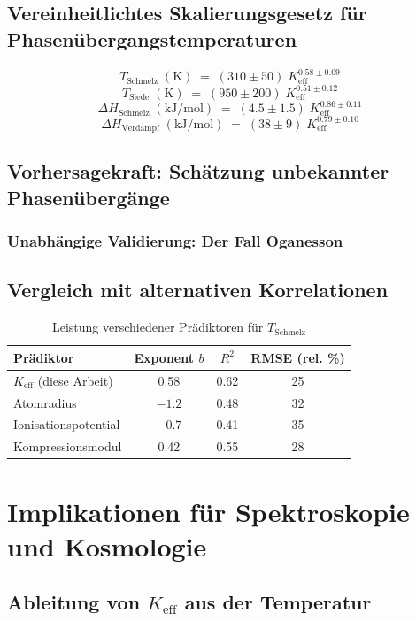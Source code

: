 \documentclass[12pt,a4paper]{article}
\theoremstyle{remark}
\newcommand{\Keff}{K_{\mathrm{eff}}}
\begin{document}
	\subsection{Vereinheitlichtes Skalierungsgesetz für Phasenübergangstemperaturen}
	\[
	\boxed{T_{\text{Schmelz}} \;(\mathrm{K}) \;=\; (310 \pm 50) \; \Keff^{0.58 \pm 0.09}}
	\]
	\[
	\boxed{T_{\text{Siede}} \;(\mathrm{K}) \;=\; (950 \pm 200) \; \Keff^{0.51 \pm 0.12}}
	\]
	\[
	\boxed{\Delta H_{\text{Schmelz}} \;(\mathrm{kJ/mol}) \;=\; (4.5 \pm 1.5) \; \Keff^{0.86 \pm 0.11}}
	\]
	\[
	\boxed{\Delta H_{\text{Verdampf}} \;(\mathrm{kJ/mol}) \;=\; (38 \pm 9) \; \Keff^{0.79 \pm 0.10}}
	\]
	
	\subsection{Vorhersagekraft: Schätzung unbekannter Phasenübergänge}
	\subsubsection{Unabhängige Validierung: Der Fall Oganesson}
	\subsection{Vergleich mit alternativen Korrelationen}
	
	\begin{table}[htbp]
		\centering
		\caption{Leistung verschiedener Prädiktoren für \(T_{\text{Schmelz}}\)}
		\label{tab:comparison}
		\begin{tabular}{@{}lccc@{}}
			\toprule
			\textbf{Prädiktor} & \textbf{Exponent }\(b\) & \textbf{\(R^2\)} & \textbf{RMSE (rel. \%)} \\
			\midrule
			\(K_{\mathrm{eff}}\) (diese Arbeit) & 0.58 & 0.62 & 25 \\
			Atomradius & \(-1.2\) & 0.48 & 32 \\
			Ionisationspotential & \(-0.7\) & 0.41 & 35 \\
			Kompressionsmodul & 0.42 & 0.55 & 28 \\
			\bottomrule
		\end{tabular}
	\end{table}
	
	\section{Implikationen für Spektroskopie und Kosmologie}
	\subsection{Ableitung von \(\Keff\) aus der Temperatur}
\end{document}

